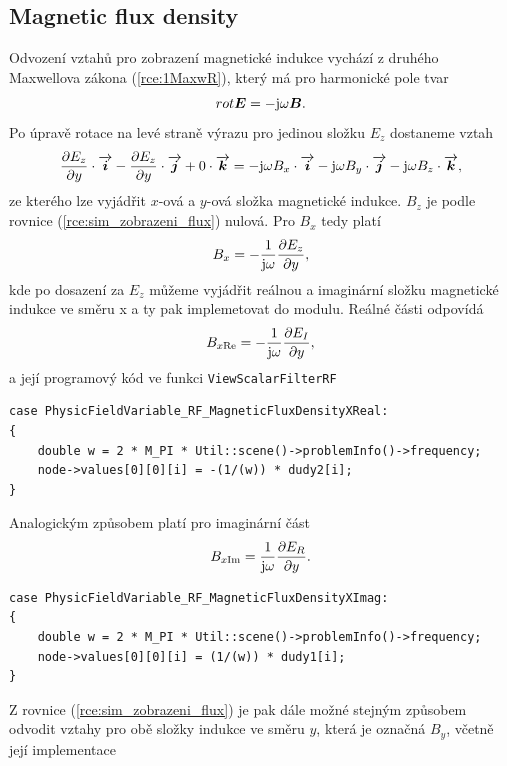 \subsection*{Magnetic flux density}
Odvození vztahů pro zobrazení magnetické indukce vychází z druhého Maxwellova zákona (\ref{rce:1MaxwR}), který má pro harmonické pole tvar
\begin{displaymath}
	rot\mbox{\boldmath$E$} = -\mathrm{j}\omega\mbox{\boldmath$B$}.
\end{displaymath}
Po úpravě rotace na levé straně výrazu pro jedinou složku $E_z$ dostaneme vztah
\begin{equation}
	\frac{\partial E_z}{\partial y}\cdot\overrightarrow{\mbox{\boldmath$i$}} - \frac{\partial E_z}{\partial y}\cdot\overrightarrow{\mbox{\boldmath$j$}} + 0\cdot\overrightarrow{\mbox{\boldmath$k$}} = -\mathrm{j}\omega B_x\cdot\overrightarrow{\mbox{\boldmath$i$}} - \mathrm{j}\omega B_y\cdot\overrightarrow{\mbox{\boldmath$j$}} - \mathrm{j}\omega B_z\cdot\overrightarrow{\mbox{\boldmath$k$}},
	\label{rce:sim_zobrazeni_flux}
\end{equation}
ze kterého lze vyjádřit $x$-ová a $y$-ová složka magnetické indukce. $B_z$ je podle rovnice (\ref{rce:sim_zobrazeni_flux}) nulová. Pro $B_x$ tedy platí
\begin{displaymath}
	B_x = -\frac{1}{\mathrm{j}\omega}\frac{\partial E_z}{\partial y},
\end{displaymath}
kde po dosazení za $E_z$ můžeme vyjádřit reálnou a imaginární složku magnetické indukce ve směru x a ty pak implemetovat do modulu. Reálné části odpovídá 
\begin{equation}
	B_{x\mathrm{Re}} = -\frac{1}{\mathrm{j}\omega}\frac{\partial E_I}{\partial y},
	\label{rce:sim_flux_x_re}
\end{equation}
a její programový kód ve funkci \texttt{ViewScalarFilterRF}
\begin{verbatim}
case PhysicFieldVariable_RF_MagneticFluxDensityXReal:
{
    double w = 2 * M_PI * Util::scene()->problemInfo()->frequency;
    node->values[0][0][i] = -(1/(w)) * dudy2[i];
}
\end{verbatim}
Analogickým způsobem platí pro imaginární část
\begin{equation}
	B_{x\mathrm{Im}} = \frac{1}{\mathrm{j}\omega}\frac{\partial E_R}{\partial y}.
	\label{rce:sim_flux_x_im}
\end{equation}
\begin{verbatim}
case PhysicFieldVariable_RF_MagneticFluxDensityXImag:
{
    double w = 2 * M_PI * Util::scene()->problemInfo()->frequency;
    node->values[0][0][i] = (1/(w)) * dudy1[i];
}    
\end{verbatim}
Z rovnice (\ref{rce:sim_zobrazeni_flux}) je pak dále možné stejným způsobem odvodit vztahy pro obě složky indukce ve směru $y$, která je označná $B_y$, včetně její implementace
